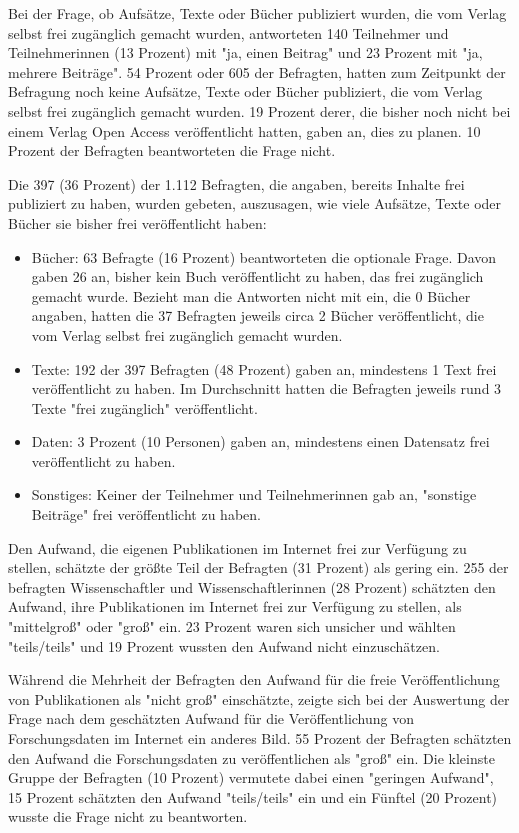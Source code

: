 Bei der Frage, ob Aufsätze, Texte oder Bücher publiziert wurden, die vom Verlag selbst frei zugänglich gemacht wurden, antworteten 140 Teilnehmer und Teilnehmerinnen (13 Prozent) mit "ja, einen Beitrag" und 23 Prozent mit "ja, mehrere Beiträge". 54 Prozent oder 605 der Befragten, hatten zum Zeitpunkt der Befragung noch keine Aufsätze, Texte oder Bücher publiziert, die vom Verlag selbst frei zugänglich gemacht wurden.  19 Prozent derer, die bisher noch nicht bei einem Verlag Open Access veröffentlicht hatten, gaben an, dies zu planen. 10 Prozent der Befragten beantworteten die Frage nicht.

Die 397 (36 Prozent) der 1.112 Befragten, die angaben, bereits Inhalte frei publiziert zu haben, wurden gebeten, auszusagen, wie viele Aufsätze, Texte oder Bücher sie bisher frei veröffentlicht haben:
\begin{itemize}
\item Bücher: 63 Befragte (16 Prozent) beantworteten die optionale Frage. Davon gaben 26 an, bisher kein Buch veröffentlicht zu haben, das frei zugänglich gemacht wurde. Bezieht man die Antworten nicht mit ein, die 0 Bücher angaben, hatten die 37 Befragten jeweils circa 2 Bücher veröffentlicht, die vom Verlag selbst frei zugänglich gemacht wurden.
\item Texte: 192 der 397 Befragten (48 Prozent) gaben an, mindestens 1 Text frei veröffentlicht zu haben. Im Durchschnitt hatten die Befragten jeweils rund 3 Texte "frei zugänglich" veröffentlicht.
\item Daten: 3 Prozent (10 Personen) gaben an, mindestens einen Datensatz frei veröffentlicht zu haben.
\item Sonstiges: Keiner der Teilnehmer und Teilnehmerinnen gab an, "sonstige Beiträge" frei veröffentlicht zu haben.
\end{itemize}

Den Aufwand, die eigenen Publikationen im Internet frei zur Verfügung zu stellen, schätzte der größte Teil der Befragten (31 Prozent) als gering ein. 255 der befragten Wissenschaftler und Wissenschaftlerinnen (28 Prozent) schätzten den Aufwand, ihre Publikationen im Internet frei zur Verfügung zu stellen, als "mittelgroß" oder "groß" ein. 23 Prozent waren sich unsicher und wählten "teils/teils" und 19 Prozent wussten den Aufwand nicht einzuschätzen.

Während die Mehrheit der Befragten den Aufwand für die freie Veröffentlichung von Publikationen als "nicht groß" einschätzte, zeigte sich bei der Auswertung der Frage nach dem geschätzten Aufwand für die Veröffentlichung von Forschungsdaten im Internet ein anderes Bild. 55 Prozent der Befragten schätzten den Aufwand die Forschungsdaten zu veröffentlichen als "groß" ein. Die kleinste Gruppe der Befragten (10 Prozent) vermutete dabei einen "geringen Aufwand", 15 Prozent schätzten den Aufwand "teils/teils" ein und ein Fünftel (20 Prozent) wusste die Frage nicht zu beantworten.

